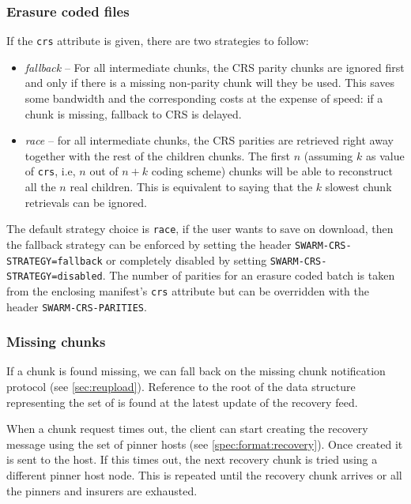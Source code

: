 \subsubsection{Erasure coded files}

If the \lstinline{crs} attribute is given, there are two strategies to follow: 

\begin{itemize}
\item \emph{fallback} -- For all intermediate chunks, the CRS parity chunks are ignored first and only if there is a missing non-parity chunk will they be used. This saves some bandwidth and the corresponding costs at the expense of speed: if a chunk is missing, fallback to CRS is delayed.
\item \emph{race} -- for all intermediate chunks, the CRS parities are retrieved right away together with the rest of the children chunks. The first $n$ (assuming $k$ as value of \lstinline{crs}, i.e, $n$ out of $n+k$ coding scheme) chunks will be able to reconstruct all the $n$ real children. This is equivalent to saying that the $k$ slowest chunk retrievals can be ignored.  
\end{itemize}

The default strategy choice is \lstinline{race}, if the user wants to save on download, then the fallback strategy can be enforced by setting the header \lstinline{SWARM-CRS-STRATEGY=fallback} or completely disabled by setting \lstinline{SWARM-CRS-STRATEGY=disabled}. The number of parities for an erasure coded batch is taken from the enclosing manifest's \lstinline{crs} attribute but can be overridden with the header \lstinline{SWARM-CRS-PARITIES}.

\subsubsection{Missing chunks}

If a chunk is found missing, we can fall back on the missing chunk notification protocol (see \ref{sec:reupload}). Reference to the root of the data structure representing the set of  is found at the latest update of the recovery feed. 

When a chunk request times out, the client can start creating the recovery message using the set of pinner hosts (see \ref{spec:format:recovery}). Once created it is sent to the host. If this times out, the next recovery chunk is tried using a different pinner host node. This is repeated until the recovery chunk arrives or all the pinners and insurers are exhausted.

